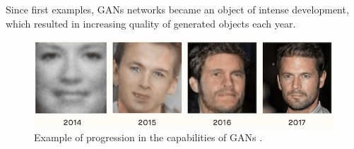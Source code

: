 \documentclass[12pt,a4paper,openany]{book}
\begin{document}
 \newpage
\noindent Since first examples, GANs networks became an object of intense development, which resulted in increasing quality of generated objects each year.

 \begin{figure}[ht!]
     \centering
     \includegraphics[scale=0.5]{figs/gan_progression.png}
     \caption{Example of progression in the capabilities of GANs \cite{ganprogress}. }
 \end{figure}
 
\end{document}
